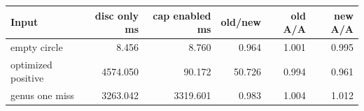 \begin{center}
\small
\begin{tabular}{lrrrrr}
\toprule
Input & disc only ms & cap enabled ms & old/new & old A/A & new A/A\\
\midrule
empty circle & 8.456 & 8.760 & 0.964 & 1.001 & 0.995\\
optimized positive & 4574.050 & 90.172 & 50.726 & 0.994 & 0.961\\
genus one miss & 3263.042 & 3319.601 & 0.983 & 1.004 & 1.012\\
\bottomrule
\end{tabular}
\end{center}
